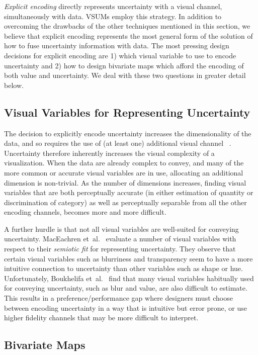 \documentclass{vgtc}                          %
\newcommand{\ea}{{et~al.}\xspace}
\begin{document}
\emph{Explicit encoding} directly represents uncertainty with a visual channel, simultaneously with data. VSUMs employ this strategy. In addition to overcoming the drawbacks of the other techniques mentioned in this section, we believe that explicit encoding represents the most general form of the solution of how to fuse uncertainty information with data. The most pressing design decisions for explicit encoding are 1) which visual variable to use to encode uncertainty and 2) how to design bivariate maps which afford the encoding of both value and uncertainty. We deal with these two questions in greater detail below.

\subsection{Visual Variables for Representing Uncertainty}

The decision to explicitly encode uncertainty increases the dimensionality of the data, and so requires the use of (at least one) additional visual channel ~\cite{brodlie2012review}. Uncertainty therefore inherently increases the visual complexity of a visualization. When the data are already complex to convey, and many of the more common or accurate visual variables are in use, allocating an additional dimension is non-trivial. As the number of dimensions increases, finding visual variables that are both perceptually accurate (in either estimation of quantity or discrimination of category) as well as perceptually separable from all the other encoding channels, becomes more and more difficult.

A further hurdle is that not all visual variables are well-suited for conveying uncertainty. MacEachren \ea~\cite{maceachren2012visual} evaluate a number of visual variables with respect to their \emph{semiotic fit} for representing uncertainty. They observe that certain visual variables such as blurriness and transparency seem to have a more intuitive connection to uncertainty than other variables such as shape or hue. Unfortunately, Boukhelifa \ea~\cite{boukhelifa2012evaluating} find that many visual variables habitually used for conveying uncertainty, such as blur and value, are also difficult to estimate. This results in a preference/performance gap where designers must choose between encoding uncertainty in a way that is intuitive but error prone, or use higher fidelity channels that may be more difficult to interpret.

\subsection{Bivariate Maps}
\end{document}
